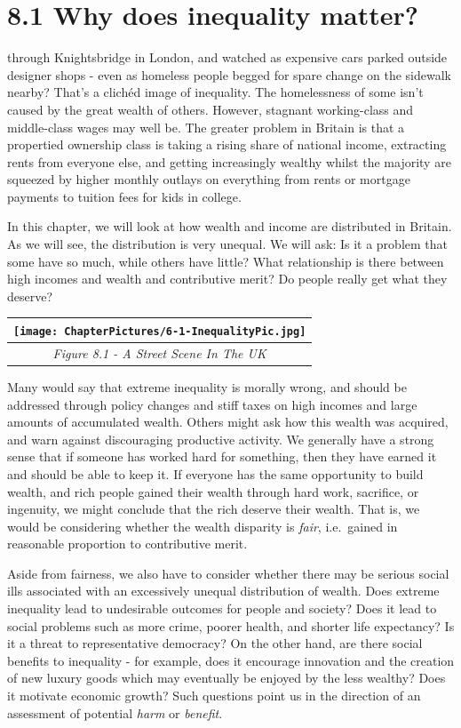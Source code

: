 \documentclass[]{tufte-handout}
\begin{document}
\hypertarget{why-does-inequality-matter}{%
\section{8.1 Why does inequality
matter?}\label{why-does-inequality-matter}}

 through Knightsbridge in London, and
watched as expensive cars parked outside designer shops - even as
homeless people begged for spare change on the sidewalk nearby? That's a
clichéd image of inequality. The homelessness of some isn't caused by
the great wealth of others. However, stagnant working-class and
middle-class wages may well be. The greater problem in Britain is that a
propertied ownership class is taking a rising share of national income,
extracting rents from everyone else, and getting increasingly wealthy
whilst the majority are squeezed by higher monthly outlays on everything
from rents or mortgage payments to tuition fees for kids in college.

In this chapter, we will look at how wealth and income are distributed
in Britain. As we will see, the distribution is very unequal. We will
ask: Is it a problem that some have so much, while others have little?
What relationship is there between high incomes and wealth and
contributive merit? Do people really get what they deserve?

\begin{longtable}[]{@{}c@{}}
\toprule
\texttt{[image: ChapterPictures/6-1-InequalityPic.jpg]}\tabularnewline
\midrule
\endhead
\emph{Figure 8.1 - A Street Scene In The UK}\tabularnewline
\bottomrule
\end{longtable}

Many would say that extreme inequality is morally wrong, and should be
addressed through policy changes and stiff taxes on high incomes and
large amounts of accumulated wealth. Others might ask how this wealth
was acquired, and warn against discouraging productive activity. We
generally have a strong sense that if someone has worked hard for
something, then they have earned it and should be able to keep it. If
everyone has the same opportunity to build wealth, and rich people
gained their wealth through hard work, sacrifice, or ingenuity, we might
conclude that the rich deserve their wealth. That is, we would be
considering whether the wealth disparity is \emph{fair}, i.e.~gained in
reasonable proportion to contributive merit.

Aside from fairness, we also have to consider whether there may be
serious social ills associated with an excessively unequal distribution
of wealth. Does extreme inequality lead to undesirable outcomes for
people and society? Does it lead to social problems such as more crime,
poorer health, and shorter life expectancy? Is it a threat to
representative democracy? On the other hand, are there social benefits
to inequality - for example, does it encourage innovation and the
creation of new luxury goods which may eventually be enjoyed by the less
wealthy? Does it motivate economic growth? Such questions point us in
the direction of an assessment of potential \emph{harm} or
\emph{benefit}.
\end{document}
